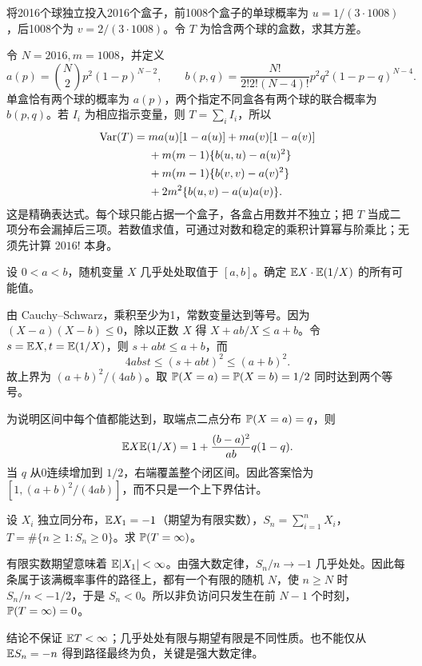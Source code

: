 \begin{example}[原题3：非均匀投球中的二球盒数]\label{yau:2016-3}
将2016个球独立投入2016个盒子，前1008个盒子的单球概率为 $u=1/(3\cdot1008)$，后1008个为 $v=2/(3\cdot1008)$。令 $T$ 为恰含两个球的盒数，求其方差。
\end{example}
\begin{solve}
令 $N=2016,m=1008$，并定义
\[
a(p)=\binom N2p^2(1-p)^{N-2},\qquad
b(p,q)=\frac{N!}{2!2!(N-4)!}p^2q^2(1-p-q)^{N-4}.
\]
单盒恰有两个球的概率为 $a(p)$，两个指定不同盒各有两个球的联合概率为 $b(p,q)$。若 $I_i$ 为相应指示变量，则 $T=\sum_iI_i$，所以
\[
\begin{aligned}
\operatorname{Var}(T)={}&m a(u)[1-a(u)]+m a(v)[1-a(v)]\\
&+m(m-1)\{b(u,u)-a(u)^2\}\\
&+m(m-1)\{b(v,v)-a(v)^2\}\\
&+2m^2\{b(u,v)-a(u)a(v)\}.
\end{aligned}
\]
这是精确表达式。每个球只能占据一个盒子，各盒占用数并不独立；把 $T$ 当成二项分布会漏掉后三项。若数值求值，可通过对数和稳定的乘积计算幂与阶乘比；无须先计算 $2016!$ 本身。
\end{solve}

\begin{example}[原题4：均值与倒数均值的乘积]\label{yau:2016-4}
设 $0<a<b$，随机变量 $X$ 几乎处处取值于 $[a,b]$。确定 $\mathbb E X\cdot\mathbb E(1/X)$ 的所有可能值。
\end{example}
\begin{solve}
由 Cauchy--Schwarz，乘积至少为1，常数变量达到等号。因为 $(X-a)(X-b)\le0$，除以正数 $X$ 得 $X+ab/X\le a+b$。令 $s=\mathbb E X,t=\mathbb E(1/X)$，则 $s+abt\le a+b$，而
\[
4abst\le(s+abt)^2\le(a+b)^2.
\]
故上界为 $(a+b)^2/(4ab)$。取 $\mathbb P(X=a)=\mathbb P(X=b)=1/2$ 同时达到两个等号。

为说明区间中每个值都能达到，取端点二点分布 $\mathbb P(X=a)=q$，则
\[
\mathbb E X\mathbb E(1/X)=1+\frac{(b-a)^2}{ab}q(1-q).
\]
当 $q$ 从0连续增加到 $1/2$，右端覆盖整个闭区间。因此答案恰为 $[1,(a+b)^2/(4ab)]$，而不只是一个上下界估计。
\end{solve}

\begin{example}[原题5：负漂移下的非负访问次数]\label{yau:2016-5}
设 $X_i$ 独立同分布，$\mathbb E X_1=-1$（期望为有限实数），$S_n=\sum_{i=1}^nX_i$，$T=\#\{n\ge1:S_n\ge0\}$。求 $\mathbb P(T=\infty)$。
\end{example}
\begin{solve}
有限实数期望意味着 $\mathbb E|X_1|<\infty$。由强大数定律，$S_n/n\to-1$ 几乎处处。因此每条属于该满概率事件的路径上，都有一个有限的随机 $N$，使 $n\ge N$ 时 $S_n/n<-1/2$，于是 $S_n<0$。所以非负访问只发生在前 $N-1$ 个时刻，$\mathbb P(T=\infty)=0$。

结论不保证 $\mathbb E T<\infty$；几乎处处有限与期望有限是不同性质。也不能仅从 $\mathbb E S_n=-n$ 得到路径最终为负，关键是强大数定律。
\end{solve}

